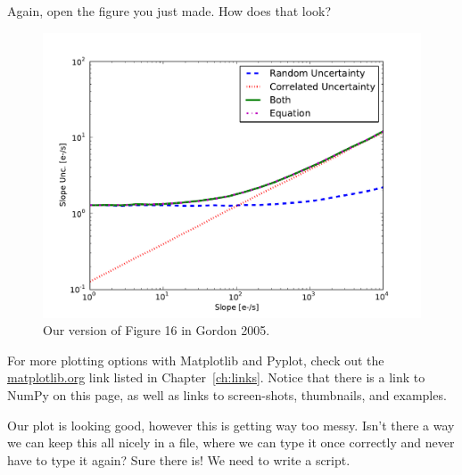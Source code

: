 Again, open the figure you just made.  How does that look?  

\begin{figure}[tbp]
  \centering
    \includegraphics[scale=0.6]{splot_log.pdf}
    \caption{Our version of Figure 16 in Gordon 2005.}
  \label{fig:splot}
\end{figure}

For more
plotting options with Matplotlib and Pyplot, check out the 
\href{http://matplotlib.org/}{matplotlib.org} link listed in
Chapter~\ref{ch:links}.  Notice that there is a link to NumPy on this
page, as well as links to screen-shots, thumbnails, and examples.

Our plot is looking good, however this is getting way too messy.
Isn't there a way we can keep this all nicely in a file, where we can
type it once correctly and never have to type it again?  Sure there
is!  We need to write a script.
